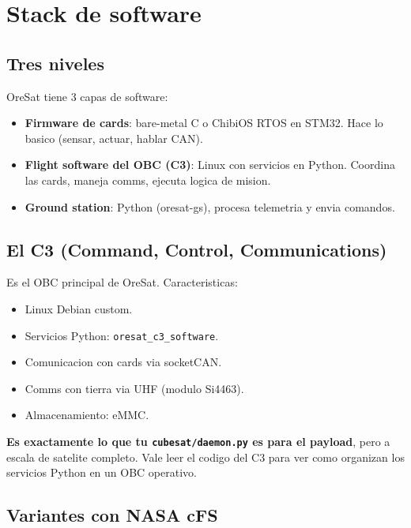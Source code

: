 \documentclass[11pt,a4paper,oneside]{report}
\begin{document}
\chapter{Stack de software}

\section{Tres niveles}

OreSat tiene 3 capas de software:

\begin{itemize}[leftmargin=2em]
  \item \textbf{Firmware de cards}: bare-metal C o ChibiOS RTOS en STM32.
        Hace lo basico (sensar, actuar, hablar CAN).
  \item \textbf{Flight software del OBC (C3)}: Linux con servicios en
        Python. Coordina las cards, maneja comms, ejecuta logica de mision.
  \item \textbf{Ground station}: Python (oresat-gs), procesa telemetria y
        envia comandos.
\end{itemize}

\section{El C3 (Command, Control, Communications)}

Es el OBC principal de OreSat. Caracteristicas:

\begin{itemize}[leftmargin=2em]
  \item Linux Debian custom.
  \item Servicios Python: \texttt{oresat\_c3\_software}.
  \item Comunicacion con cards via socketCAN.
  \item Comms con tierra via UHF (modulo Si4463).
  \item Almacenamiento: eMMC.
\end{itemize}

\begin{leccion}
\textbf{Es exactamente lo que tu \texttt{cubesat/daemon.py} es para el
payload}, pero a escala de satelite completo. Vale leer el codigo del C3
para ver como organizan los servicios Python en un OBC operativo.
\end{leccion}

\section{Variantes con NASA cFS}
\end{document}
